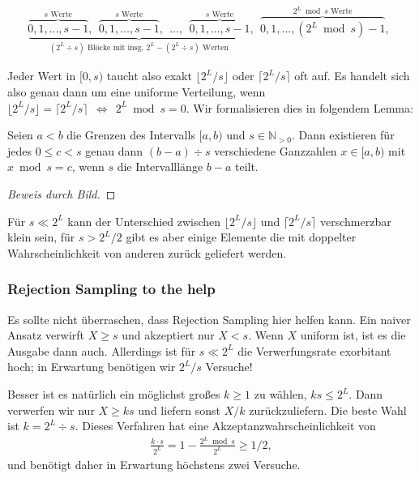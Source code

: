 \begin{align}
    \underbrace{
        \overbrace{0, 1, \ldots, s{-}1}^\text{$s$ Werte},\ \
        \overbrace{0, 1, \ldots, s{-}1}^\text{$s$ Werte},\ \
        \ldots, \ \
        \overbrace{0, 1, \ldots, s{-}1}^\text{$s$ Werte}
    }_\text{$(2^L \div s)$ Blöcke mit insg. $2^L - (2^L \div s)$ Werten},\ \
    \overbrace{0, 1, \ldots, (2^L \bmod s){-}1}^\text{$2^L \bmod s$ Werte},\ \
    \label{eq:s_bloecke_in_2l}
\end{align}

Jeder Wert in $[0, s)$ taucht also exakt $\lfloor 2^L / s \rfloor$ oder $\lceil 2^L /s \rceil$ oft auf.
Es handelt sich also genau dann um eine uniforme Verteilung, wenn $\lfloor 2^L / s \rfloor = \lceil 2^L /s \rceil\ \ \Leftrightarrow\ \ 2^L \bmod s = 0$.
Wir formalisieren dies in folgendem Lemma:

\begin{lemma}\label{lem:gleichverteilt_in_ab}
    Seien $a < b$ die Grenzen des Intervalls $[a, b)$ und $s \in \mathbb N_{>0}$.
    Dann existieren für jedes $0 \le c < s$ genau dann $(b - a) \div s$ verschiedene Ganzzahlen $x \in [a, b)$ mit $x \bmod s = c$, wenn $s$ die Intervalllänge $b-a$ teilt.
\end{lemma}
\begin{proof}[Beweis durch Bild]
\end{proof}

Für $s \ll 2^L$ kann der Unterschied zwischen $\lfloor 2^L /s \rfloor$ und $\lceil 2^L / s \rceil$ verschmerzbar klein sein, für $s > 2^L / 2$ gibt es aber einige Elemente die mit doppelter Wahrscheinlichkeit von anderen zurück geliefert werden.

\subsubsection{Rejection Sampling to the help}
Es sollte nicht überraschen, dass Rejection Sampling hier helfen kann.
Ein naiver Ansatz verwirft $X \ge s$ und akzeptiert nur $X < s$.
Wenn $X$ uniform ist, ist es die Ausgabe dann auch.
Allerdings ist für $s \ll 2^L$ die Verwerfungsrate exorbitant hoch;
in Erwartung benötigen wir $2^L / s$ Versuche!

Besser ist es natürlich ein möglichst großes $k \ge 1$ zu wählen, \sd $k s \le 2^L$.
Dann verwerfen wir nur $X \ge ks$ und liefern sonst $X / k$ zurückzuliefern.
Die beste Wahl ist $k = 2^L \div s$.
Dieses Verfahren hat eine Akzeptanzwahrscheinlichkeit von
\begin{align}
    \frac{k \cdot s}{2^L} = 1 - \frac{2^L \bmod s}{2^L} \ge 1/2,
\end{align}
und benötigt daher in Erwartung höchstens zwei Versuche.

